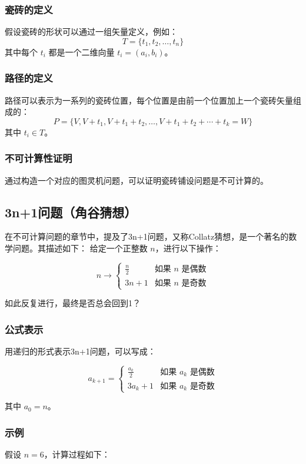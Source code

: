 \documentclass[UTF-8,a4paper,9pt]{article}
\begin{document}
\subsubsection*{瓷砖的定义}
假设瓷砖的形状可以通过一组矢量定义，例如：
\[
  T = \{t_1, t_2, \ldots, t_n\} \tag{2}
\]
其中每个 $t_i$ 都是一个二维向量 $t_i = (a_i, b_i)$。

\subsubsection*{路径的定义}
路径可以表示为一系列的瓷砖位置，每个位置是由前一个位置加上一个瓷砖矢量组成的：
\[
  P = \{V, V + t_1, V + t_1 + t_2, \ldots, V + t_1 + t_2 + \cdots + t_k = W\} \tag{3}
\]
其中 $t_i \in T$。


\subsubsection*{不可计算性证明}
通过构造一个对应的图灵机问题，可以证明瓷砖铺设问题是不可计算的。

\subsection{3n+1问题（角谷猜想）}
在不可计算问题的章节中，提及了3n+1问题，又称Collatz猜想，是一个著名的数学问题。其描述如下：
给定一个正整数 $n$，进行以下操作：

\[
  n \rightarrow
  \begin{cases}
    \frac{n}{2} & \text{如果 } n \text{ 是偶数} \\
    3n + 1      & \text{如果 } n \text{ 是奇数}
  \end{cases} \tag{1}
\]

如此反复进行，最终是否总会回到1？

\subsubsection{公式表示}
用递归的形式表示3n+1问题，可以写成：

\[
  a_{k+1} =
  \begin{cases}
    \frac{a_k}{2} & \text{如果 } a_k \text{ 是偶数} \\
    3a_k + 1      & \text{如果 } a_k \text{ 是奇数}
  \end{cases} \tag{2}
\]

其中 $a_0 = n$。

\subsubsection{示例}
假设 $n = 6$，计算过程如下：
\end{document}

